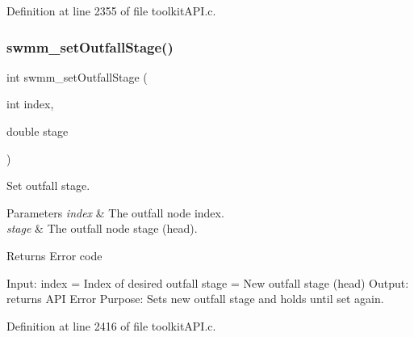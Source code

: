 Definition at line 2355 of file toolkit\+A\+P\+I.\+c.

\mbox{\label{group__tkfuncs_ga80d902400625073d8ff2c392365fde9b}} 
\subsubsection{\texorpdfstring{swmm\_setOutfallStage()}{swmm\_setOutfallStage()}}
{\footnotesize\ttfamily int swmm\+\_\+set\+Outfall\+Stage (\begin{DoxyParamCaption}\item[{int}]{index,  }\item[{double}]{stage }\end{DoxyParamCaption})}



Set outfall stage. 


\begin{DoxyParams}{Parameters}
{\em index} & The outfall node index. \\
\hline
{\em stage} & The outfall node stage (head). \\
\hline
\end{DoxyParams}
\begin{DoxyReturn}{Returns}
Error code
\end{DoxyReturn}
Input\+: index = Index of desired outfall stage = New outfall stage (head) Output\+: returns A\+PI Error Purpose\+: Sets new outfall stage and holds until set again. 

Definition at line 2416 of file toolkit\+A\+P\+I.\+c.

